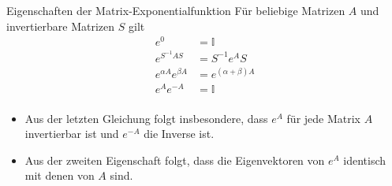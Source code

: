 \begin{frame}{Eigenschaften der Matrix-Exponentialfunktion}
  Für beliebige Matrizen $A$ und invertierbare Matrizen $S$ gilt
  \begin{align*}
    e^0 &= \mathbb I\\
    e^{S^{-1}AS} &= S^{-1} e^A S\\
    e^{\alpha A} e^{\beta A} &= e^{(\alpha+\beta) A}\\
    e^{A}e^{-A} &= \mathbb I\\
  \end{align*}
  \begin{itemize}
  \item Aus der letzten Gleichung folgt insbesondere, dass $e^A$ für jede
    Matrix $A$ invertierbar ist und $e^{-A}$ die Inverse ist.
  \item Aus der zweiten Eigenschaft folgt, dass die Eigenvektoren von
    $e^A$ identisch mit denen von $A$ sind.
  \end{itemize}
\end{frame}

